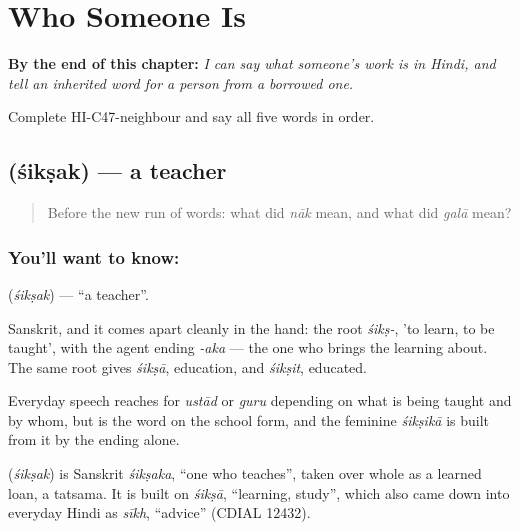
\chapter{Who Someone Is}
\label{ch:hi-roles}

\begin{chapteropening}
\textbf{By the end of this chapter:} \emph{I can say what someone's work is in Hindi, and tell an inherited word for a person from a borrowed one.}

Complete HI-C47-neighbour and say all five words in order.
\end{chapteropening}

\section[\texorpdfstring{\hi{शिक्षक} (śikṣak)}{शिक्षक (śikṣak)}]{ (śikṣak) — a teacher}

\label{lesson:HI-C47-teacher}



\begin{quote}
Before the new run of words: what did \emph{nāk} mean, and what did \emph{galā} mean?
\end{quote}

\subsection*{You'll want to know: }
\textbf{} (\emph{śikṣak}) — \textquotedblleft{}a teacher\textquotedblright{}.

Sanskrit, and it comes apart cleanly in the hand: the root \emph{śikṣ-}, 'to learn, to be taught', with the agent ending \emph{-aka} — the one who brings the learning about. The same root gives \emph{śikṣā}, education, and \emph{śikṣit}, educated.

Everyday speech reaches for \emph{ustād} or \emph{guru} depending on what is being taught and by whom, but  is the word on the school form, and the feminine \emph{śikṣikā} is built from it by the ending alone.

\begin{cousinweb}
\textbf{} (\emph{śikṣak}) is Sanskrit \emph{śikṣaka}, \textquotedblleft{}one who teaches\textquotedblright{}, taken over whole as a learned loan, a tatsama. It is built on \emph{śikṣā}, \textquotedblleft{}learning, study\textquotedblright{}, which also came down into everyday Hindi as \emph{sīkh}, \textquotedblleft{}advice\textquotedblright{} (CDIAL 12432).
\end{cousinweb}

